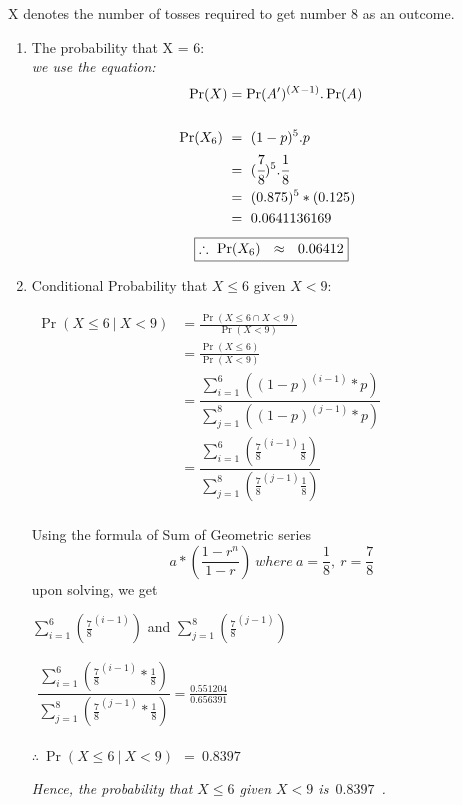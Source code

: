 \documentclass{article}
\begin{document}
\begin{enumerate}
\textnormal{X denotes the number of tosses required to get number 8 as an outcome.}\\
\begin{enumerate}
    \item \textnormal{The probability that X = 6:}\\
    \textit{we use the equation:}
    \begin{align*}
      \Pr(X) & = \Pr(A')^{(X-1)}.\Pr(A)\\\\
      \Pr(X_6)\  & =\  (1-p)^{5}.p\\
      & =\ (\cfrac{7}{8})^{5}.\cfrac{1}{8}\\
      & =\ (0.875)^{5}*(0.125)\\
      & =\ 0.0641136169
    \end{align*}
    \[
     \boxed{\therefore\ \Pr(X_6)\ \ \approx \ \ 0.06412}\\
    \]
    \item \textnormal{Conditional Probability that $X \leq 6$ given $X < 9$:}
    \begin{center}
    $\begin{aligned}
      \Pr(X \leq 6 \ | \ X < 9) & = \frac{\Pr(X \leq 6 \cap X < 9)}{\Pr(X < 9)}\\
     & = \frac{\Pr(X \leq 6)}{\Pr(X < 9)}\\
     & = \dfrac{ \sum_{i=1}^{6}((1 - p)^{(i - 1)}*p)}{ \sum_{j=1}^{8}((1 - p)^{(j - 1)}*p)}\\
     & = \dfrac{ \sum_{i=1}^{6}(\frac{7}{8}^{(i - 1)}\frac{1}{8})}{ \sum_{j=1}^{8}(\frac{7}{8}^{(j - 1)}\frac{1}{8})}\\
     \end{aligned}$
   \end{center}
   \textnormal{Using the formula of Sum of Geometric series} 
   \begin{equation}                    
    a *( \dfrac{1-r^n}{1-r} ) \ where  \ a =\frac{1}{8}, \ r = \frac{7}{8}
    \end{equation}
   \textnormal{upon solving, we get} \begin{center}
       $\sum_{i=1}^{6}(\frac{7}{8}^{(i - 1)})$ and $\sum_{j=1}^{8}(\frac{7}{8}^{(j - 1)})$
   \end{center}
   \begin{center}
       $\begin{aligned}
          \dfrac{\sum_{i=1}^{6}(\frac{7}{8}^{(i - 1)}* \frac{1}{8})}{\sum_{j=1}^{8}(\frac{7}{8}^{(j - 1)}* \frac{1}{8})} = \frac{0.551204}{0.656391}\\
       \end{aligned}$
   \end{center}
   \begin{center}
       $\boxed{\therefore\ \Pr(X\leq 6 \ | \ X < 9)\ \ =  \ 0.8397\ }$
   \end{center}
\textit{Hence, the probability that $X \leq 6$ given $X < 9$ is $0.8397$ .}\\\\
  \end{enumerate}


\end{enumerate}
\end{document}
